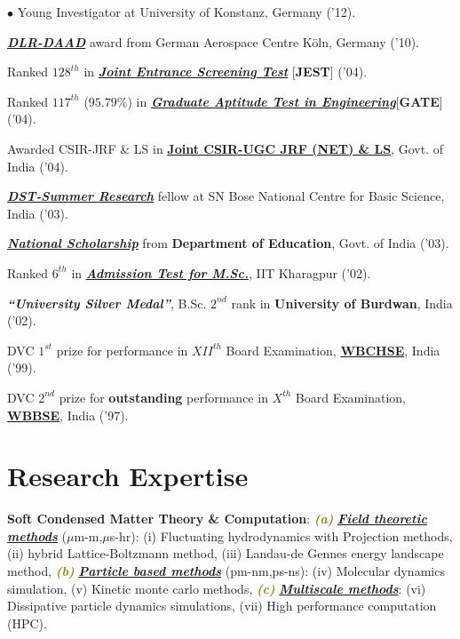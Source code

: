 \documentclass[margin,line]{res}
\newenvironment{list2}{
  \begin{list}{$\bullet$}{%
      \setlength{\itemsep}{0in}
      \setlength{\parsep}{0in} \setlength{\parskip}{0in}
      \setlength{\topsep}{0in} \setlength{\partopsep}{0in} 
      \setlength{\leftmargin}{0.2in}}}{\end{list}}
\begin{document}
\begin{resume}
\begin{list2}
{{{      Young Investigator}}} at University of Konstanz, Germany ('12).
\item \href{https://www.daad.de/deutschland/stipendium/datenbank/en/15370-dlr-daad-research-fellowships-in-the-fields-of-space-aeronautics-energy-and-transportation-research/}{\textit{\textbf{DLR-DAAD}}} award from German Aerospace Centre K\"{o}ln, Germany ('10).
\item Ranked {$128^{th}$} in \href{https://www.jest.org.in/}{\textit{\textbf{Joint Entrance Screening Test}}} [{\bf JEST}] ('04).
\item Ranked {$117^{th}$} ($95.79\%$) in \href{https://en.wikipedia.org/wiki/Graduate_Aptitude_Test_in_Engineering}{\textit{\textbf{Graduate 
      Aptitude Test in Engineering}}}[{\bf GATE}] ('04).
\item Awarded {CSIR-JRF} \& {LS} in \href{http://csirhrdg.res.in/}{{\bf Joint CSIR-UGC JRF (NET) \& LS}}, Govt. of India ('04).
\item \href{http://newweb.bose.res.in/LinkageProgrammes/VASP/Events.jsp}{\textit{\textbf{DST-Summer Research}}} fellow at {SN Bose National 
Centre for Basic Science}, India ('03). 
\item \href{http://www.scholarships.gov.in/}{\textit{\textbf{National Scholarship}}} from {\bf Department of Education}, Govt. of India ('03).
\item Ranked {$6^{th}$} in \href{https://en.wikipedia.org/wiki/Joint_Admission_Test_for_M.Sc.}{\textit{\textbf{Admission Test for M.Sc.}}}, 
      IIT Kharagpur ('02).
\item {\textit{\textbf{``University Silver Medal''}}}, B.Sc. {$2^{nd}$} rank in {\bf University of Burdwan}, India ('02).
\item DVC {$1^{st}$} prize for performance in $XII^{th}$ Board Examination, \href{http://wbchse.nic.in/html/index.html}{\bf WBCHSE}, India ('99). 
\item DVC {$2^{nd}$} prize for {\bf outstanding} performance in $X^{th}$ Board Examination, \href{http://wbbse.org/}{\bf WBBSE}, India ('97).
\end{list2}
\vspace{1mm}

\section{\sc Research Expertise}
{{\bf Soft Condensed Matter Theory \& Computation}: 
\textcolor{olive}{\textit{\textbf{(a)}}}} \textcolor{alizarin}{\ul{\textit{\textbf{Field theoretic methods}}}} ($\mu$m-m,$\mu$s-hr): 
(i) Fluctuating hydrodynamics with Projection methods, (ii) hybrid Lattice-Boltzmann method, (iii) Landau-de Gennes energy landscape 
method, \textcolor{olive}{\textit{\textbf{(b)}}} \textcolor{alizarin}{\ul{\textbf{\textit{Particle based methods}}}} (pm-nm,ps-ns): (iv) 
Molecular dynamics simulation, (v) Kinetic monte carlo methods, \textcolor{olive}{\textit{\textbf{(c)}}} 
\textcolor{alizarin}{\ul{\textbf{\textit{Multiscale methods}}}}: (vi) Dissipative particle dynamics simulations, 
(vii) High performance computation (HPC).
\vspace{1mm}


\end{resume}
\end{document}
